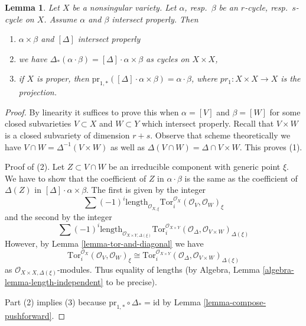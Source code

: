 \documentclass{stacks-project}
\theoremstyle{plain}
\newtheorem{lemma}[subsection]{Lemma}
\theoremstyle{definition}
\theoremstyle{remark}
\numberwithin{equation}{subsection}
\begin{document}
\begin{lemma}
\label{lemma-reduction-diagonal}
Let $X$ be a nonsingular variety. Let $\alpha$, resp.\ $\beta$
be an $r$-cycle, resp.\ $s$-cycle on $X$. Assume $\alpha$ and $\beta$
intersect properly. Then
\begin{enumerate}
\item $\alpha \times \beta$ and $[\Delta]$ intersect properly
\item we have $\Delta_*(\alpha \cdot \beta) = [\Delta] \cdot \alpha\times\beta$
as cycles on $X \times X$,
\item if $X$ is proper, then
$\text{pr}_{1, *}([\Delta] \cdot \alpha\times\beta) = \alpha\cdot\beta$,
where $pr_1 : X\times X \to X$ is the projection.
\end{enumerate}
\end{lemma}

\begin{proof}
By linearity it suffices to prove this when $\alpha = [V]$ and $\beta = [W]$
for some closed subvarieties $V \subset X$ and $W \subset Y$ which intersect
properly. Recall that $V \times W$ is a closed subvariety of dimension $r + s$.
Observe that scheme theoretically we have
$V \cap W = \Delta^{-1}(V \times W)$ as well as
$\Delta(V \cap W) = \Delta \cap V \times W$.
This proves (1).

\medskip\noindent
Proof of (2). Let $Z \subset V \cap W$ be an irreducible component
with generic point $\xi$. We have to show that the coefficient of
$Z$ in $\alpha \cdot \beta$ is the same as the coefficient of
$\Delta(Z)$ in $[\Delta] \cdot \alpha \times \beta$. The first is given
by the integer
$$
\sum (-1)^i
\text{length}_{\mathcal{O}_{X, \xi}}
\text{Tor}_i^{\mathcal{O}_X}(\mathcal{O}_V, \mathcal{O}_W)_\xi
$$
and the second by the integer
$$
\sum (-1)^i
\text{length}_{\mathcal{O}_{X \times Y, \Delta(\xi)}}
\text{Tor}_i^{\mathcal{O}_{X \times Y}}(
\mathcal{O}_\Delta, \mathcal{O}_{V \times W})_{\Delta(\xi)}
$$
However, by Lemma \ref{lemma-tor-and-diagonal} we have
$$
\text{Tor}_i^{\mathcal{O}_X}(\mathcal{O}_V, \mathcal{O}_W)_\xi \cong
\text{Tor}_i^{\mathcal{O}_{X \times Y}}(
\mathcal{O}_\Delta, \mathcal{O}_{V \times W})_{\Delta(\xi)}
$$
as $\mathcal{O}_{X \times X, \Delta(\xi)}$-modules. Thus equality
of lengths (by Algebra, Lemma \ref{algebra-lemma-length-independent}
to be precise).

\medskip\noindent
Part (2) implies (3) because
$\text{pr}_{1, *} \circ \Delta_* = \text{id}$ by
Lemma \ref{lemma-compose-pushforward}.
\end{proof}
\end{document}
